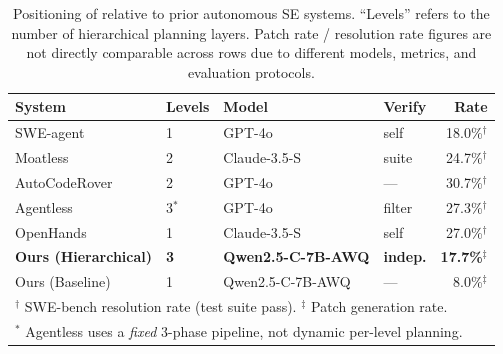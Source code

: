 \begin{table}[t]
\centering
\caption{Positioning of \sysname relative to prior autonomous SE systems.
``Levels'' refers to the number of hierarchical planning layers.
Patch rate / resolution rate figures are not directly comparable across rows
due to different models, metrics, and evaluation protocols.}
\label{tab:related}
\small
\begin{tabular}{llllr}
\toprule
\textbf{System} & \textbf{Levels} & \textbf{Model} & \textbf{Verify} &
  \textbf{Rate} \\
\midrule
SWE-agent~\cite{yang2024sweagent}        & 1     & GPT-4o            & self & 18.0\%$^\dagger$ \\
Moatless~\cite{orwall2024moatless}       & 2     & Claude-3.5-S      & suite & 24.7\%$^\dagger$ \\
AutoCodeRover~\cite{zhang2024autocoderover} & 2  & GPT-4o            & ---  & 30.7\%$^\dagger$ \\
Agentless~\cite{xia2024agentless}        & 3$^*$ & GPT-4o            & filter & 27.3\%$^\dagger$ \\
OpenHands~\cite{wang2024opendevin}       & 1     & Claude-3.5-S      & self & 27.0\%$^\dagger$ \\
\midrule
\textbf{Ours (Hierarchical)}  & \textbf{3} & \textbf{Qwen2.5-C-7B-AWQ} & \textbf{indep.} & \textbf{17.7\%}$^\ddagger$ \\
Ours (Baseline)               & 1          & Qwen2.5-C-7B-AWQ           & ---             & 8.0\%$^\ddagger$ \\
\bottomrule
\multicolumn{5}{l}{$^\dagger$ SWE-bench resolution rate (test suite pass). $^\ddagger$ Patch generation rate.} \\
\multicolumn{5}{l}{$^*$ Agentless uses a \emph{fixed} 3-phase pipeline, not dynamic per-level planning.}
\end{tabular}
\end{table}
